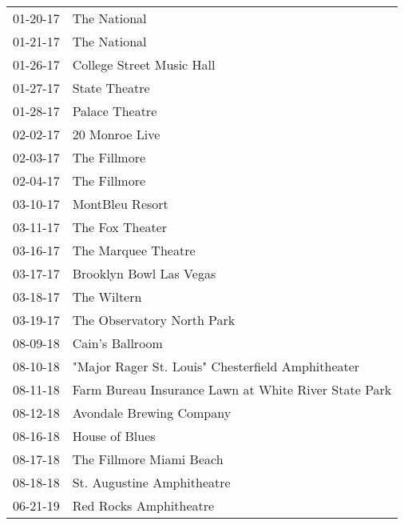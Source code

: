 \begin{supertabular}{p{0.07\textwidth}p{0.23\textwidth}}
 01-20-17 &                                          The National \\
 01-21-17 &                                          The National \\
 01-26-17 &                             College Street Music Hall \\
 01-27-17 &                                         State Theatre \\
 01-28-17 &                                        Palace Theatre \\
 02-02-17 &                                        20 Monroe Live \\
 02-03-17 &                                          The Fillmore \\
 02-04-17 &                                          The Fillmore \\
 03-10-17 &                                       MontBleu Resort \\
 03-11-17 &                                       The Fox Theater \\
 03-16-17 &                                   The Marquee Theatre \\
 03-17-17 &                               Brooklyn Bowl Las Vegas \\
 03-18-17 &                                           The Wiltern \\
 03-19-17 &                            The Observatory North Park \\
 08-09-18 &                                       Cain's Ballroom \\
 08-10-18 &     "Major Rager St. Louis" Chesterfield Amphitheater \\
 08-11-18 &  Farm Bureau Insurance Lawn at White River State Park \\
 08-12-18 &                              Avondale Brewing Company \\
 08-16-18 &                                        House of Blues \\
 08-17-18 &                              The Fillmore Miami Beach \\
 08-18-18 &                            St. Augustine Amphitheatre \\
 06-21-19 &                                Red Rocks Amphitheatre \\
\end{supertabular}
